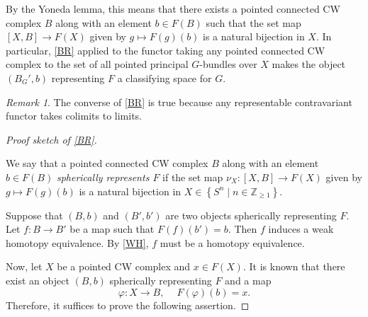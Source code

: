\documentclass[10pt,letterpaper,cm]{nupset}
\theoremstyle{definition}
\theoremstyle{theorem}
\theoremstyle{remark}
\newtheorem{remark}[defn]{Remark}
\newcommand{\Z}{\mathbb Z}
\newcommand{\1}{\mathbb{1}}
\newcommand{\0}{\vec 0}
\begin{document}
By the Yoneda lemma, this means that there exists a pointed  connected CW complex $B$ along with an element $b\in F(B)$ such that the set map $\left[X, B\right] \to F(X)$ given by $g\mapsto F(g)(b)$ is a natural bijection in $X$. In particular, \cref{BR} applied to the functor taking any pointed connected CW complex to the set of all pointed principal $G$-bundles over $X$ makes the  object $\left(B_G', b\right)$ representing $F$ a classifying space for $G$.

\begin{remark}
The converse of \cref{BR} is true because any representable contravariant functor takes colimits to limits.
\end{remark}

\begin{proof}[Proof sketch of \cref{BR}] $ $

We say that a pointed  connected CW complex $B$ along with an element $b\in F(B)$ \textit{spherically represents $F$} if the set map $\nu_X : \left[X, B\right] \to F(X)$ given by $g\mapsto F(g)(b)$ is a natural bijection in $X\in \left\{S^n \mid n\in \Z_{\geq 1}\right\}$. 

\smallskip

Suppose that $\left(B, b\right)$ and $\left(B', b'\right)$ are two objects spherically representing $F$. Let $f : B \to B'$ be a map such that $F(f)(b') = b$. Then $f$ induces a weak homotopy equivalence. By \cref{WH}, $f$ must be a homotopy equivalence.

\smallskip

Now, let $X$ be a pointed CW complex and $x\in F(X)$. It is known that there exist an object $\left(B, b\right)$ spherically representing $F$ and a map 
\[ \label{eqn:sph}
\varphi : X \to B, \ \quad F(\varphi)(b) =x \tag{$\bullet$}
.\] Therefore, it suffices to prove the following assertion.


\end{proof}
\end{document}

